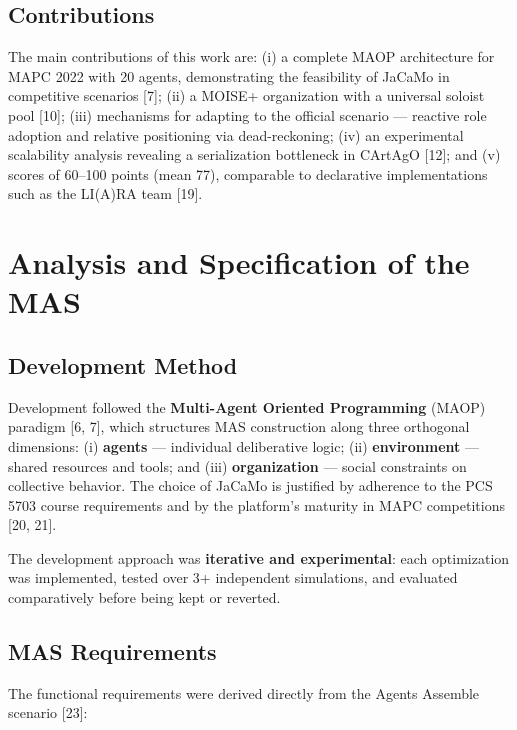 \documentclass[11pt,a4paper]{article}
\begin{document}
\subsection{Contributions}
The main contributions of this work are: (i) a complete MAOP architecture for MAPC 2022 with 20 agents, demonstrating the feasibility of JaCaMo in competitive scenarios [7]; (ii) a MOISE+ organization with a universal soloist pool [10]; (iii) mechanisms for adapting to the official scenario --- reactive role adoption and relative positioning via dead-reckoning; (iv) an experimental scalability analysis revealing a serialization bottleneck in CArtAgO [12]; and (v) scores of 60--100 points (mean 77), comparable to declarative implementations such as the LI(A)RA team [19].

\section{Analysis and Specification of the MAS}

\subsection{Development Method}
Development followed the \textbf{Multi-Agent Oriented Programming} (MAOP) paradigm [6, 7], which structures MAS construction along three orthogonal dimensions: (i) \textbf{agents} --- individual deliberative logic; (ii) \textbf{environment} --- shared resources and tools; and (iii) \textbf{organization} --- social constraints on collective behavior. The choice of JaCaMo is justified by adherence to the PCS 5703 course requirements and by the platform's maturity in MAPC competitions [20, 21].

The development approach was \textbf{iterative and experimental}: each optimization was implemented, tested over 3+ independent simulations, and evaluated comparatively before being kept or reverted.

\subsection{MAS Requirements}
The functional requirements were derived directly from the Agents Assemble scenario [23]:
\end{document}
